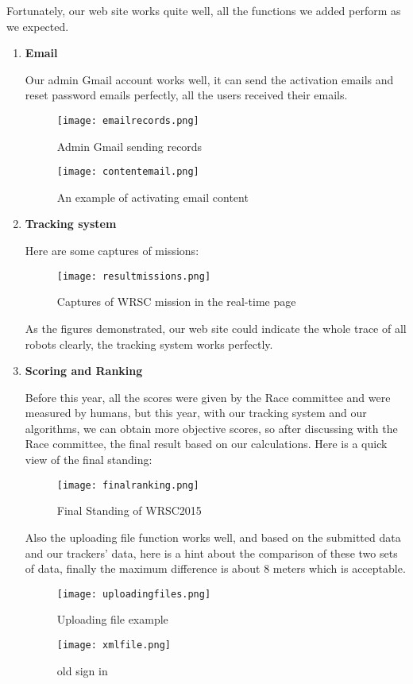 Fortunately, our web site works quite well, all the functions we added perform as we expected. 
\begin{enumerate}
\item{\textbf{Email}}

Our admin Gmail account works well, it can send the activation emails and reset password emails perfectly, all the users received their emails.
\begin{figure}[h!]
\centering
\texttt{[image: emailrecords.png]}
\caption{Admin Gmail sending records}
\label{fig-sample}
\end{figure}

\begin{figure}[h!]
\centering
\texttt{[image: contentemail.png]}
\caption{An example of activating email content}
\label{fig-sample}
\end{figure}

\item{\textbf{Tracking system}}


Here are some captures of missions:
\begin{figure}[h!]
\centering
\texttt{[image: resultmissions.png]}
\caption{Captures of WRSC mission in the real-time page }
\label{fig-sample}
\end{figure}
As the figures demonstrated, our web site could indicate the whole trace of all robots clearly, the tracking system works perfectly.

\item{\textbf{Scoring and Ranking}}

Before this year, all the scores were given by the Race committee and were measured by humans, but this year, with our tracking system and our algorithms, we can obtain more objective scores, so after discussing with the Race committee, the final result based on our calculations. Here is a quick view of the final standing:
\begin{figure}[h!]
\centering
\texttt{[image: finalranking.png]}
\caption{Final Standing of WRSC2015 }
\label{fig-sample}
\end{figure}
Also the uploading file function works well, and based on the submitted data and our trackers' data, here is a hint about the comparison of these two sets of data, finally the maximum difference is about 8 meters which is acceptable.
\begin{figure}[h!]
\centering
\texttt{[image: uploadingfiles.png]}
\caption{Uploading file example }
\label{fig-sample}
\end{figure}
\begin{figure}[h!]
\centering
\texttt{[image: xmlfile.png]}
\caption{old sign in }
\label{fig-sample}
\end{figure}
\end{enumerate}